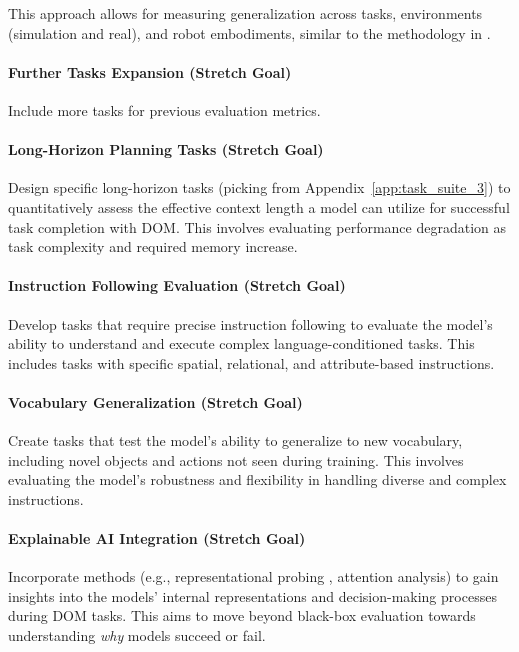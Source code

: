 
This approach allows for measuring generalization across tasks, environments (simulation and real), and robot embodiments, similar to the methodology in \cite{TransferWelle}.

\paragraph{\textbf{Further Tasks Expansion} (Stretch Goal)} 
Include more tasks for previous evaluation metrics.

\paragraph{\textbf{Long-Horizon Planning Tasks} (Stretch Goal)} 
Design specific long-horizon tasks (picking from Appendix~\ref{app:task_suite_3}) to quantitatively assess the effective context length a model can utilize for successful task completion with DOM. This involves evaluating performance degradation as task complexity and required memory increase.

\paragraph{\textbf{Instruction Following Evaluation} (Stretch Goal)} 
Develop tasks that require precise instruction following to evaluate the model's ability to understand and execute complex language-conditioned tasks. This includes tasks with specific spatial, relational, and attribute-based instructions.

\paragraph{\textbf{Vocabulary Generalization} (Stretch Goal)} Create tasks that test the model's ability to generalize to new vocabulary, including novel objects and actions not seen during training. This involves evaluating the model's robustness and flexibility in handling diverse and complex instructions.

\paragraph{\textbf{Explainable AI Integration} (Stretch Goal) } Incorporate methods (e.g., representational probing \cite{Probing-VLA}, attention analysis) to gain insights into the models' internal representations and decision-making processes during DOM tasks. This aims to move beyond black-box evaluation towards understanding \textit{why} models succeed or fail.

